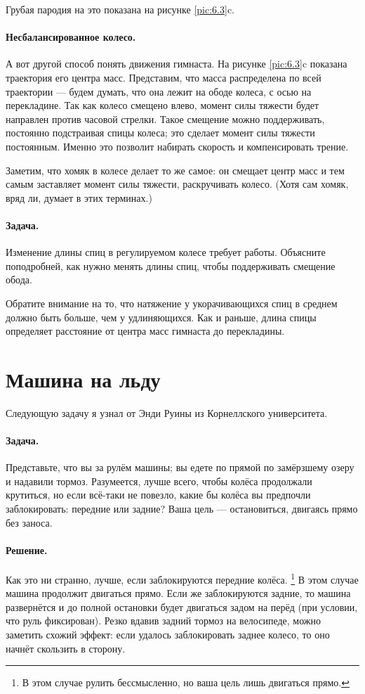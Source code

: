 Грубая пародия на это показана на рисунке \ref{pic:6.3}c.

\paragraph{Несбалансированное колесо.}
А вот другой способ понять движения гимнаста.
На рисунке \ref{pic:6.3}c показана траектория его центра масс.
Представим, что масса распределена по всей траектории --- будем думать, что она лежит на ободе колеса, с осью на перекладине.
Так как колесо смещено влево, момент силы тяжести будет направлен против часовой стрелки.
Такое смещение можно поддерживать, постоянно подстраивая спицы колеса;
это сделает момент силы тяжести постоянным.
Именно это позволит набирать скорость и компенсировать трение.

Заметим, что хомяк в колесе делает то же самое:
он смещает центр масс и тем самым заставляет момент силы тяжести, раскручивать колесо.
(Хотя сам хомяк, вряд ли, думает в этих терминах.)

\paragraph{Задача.}
Изменение длины спиц в регулируемом колесе требует работы.
Объясните поподробней, как нужно менять длины спиц, чтобы поддерживать смещение обода.

Обратите внимание на то, что натяжение у укорачивающихся спиц в среднем должно быть больше, чем у удлиняющихся.
Как и раньше, длина спицы определяет расстояние от центра масс гимнаста до перекладины.

\section{Машина на льду}

Следующую задачу я узнал от Энди Руины %
из Корнеллского университета.

\paragraph{Задача.}
Представьте, что вы за рулём машины;
вы едете по прямой по замёрзшему озеру и надавили тормоз.
Разумеется, лучше всего, чтобы колёса продолжали крутиться,
но если всё-таки не повезло, какие бы колёса вы предпочли заблокировать: передние или задние?
Ваша цель — остановиться, двигаясь прямо без заноса.

\paragraph{Решение.}
Как это ни странно, лучше, если заблокируются передние колёса.%
\footnote{В этом случае рулить бессмысленно, но ваша цель лишь двигаться прямо.}
В этом случае машина продолжит двигаться прямо.
Если же заблокируются задние, то машина развернётся и до полной остановки будет  двигаться задом на перёд (при условии, что руль фиксирован).
Резко вдавив задний тормоз на велосипеде, можно заметить схожий эффект:
если удалось заблокировать заднее колесо, то оно начнёт скользить в сторону.

